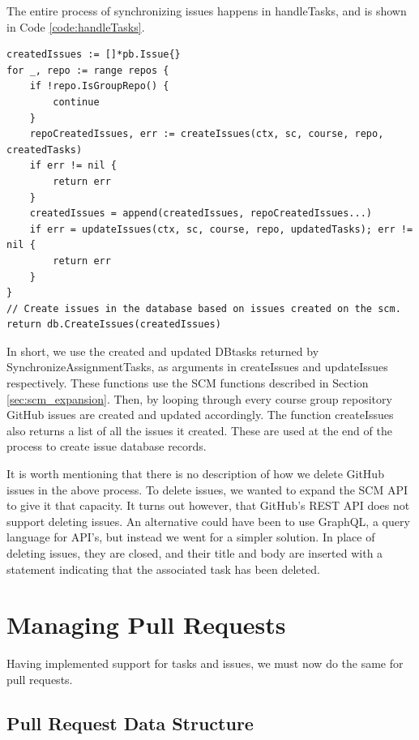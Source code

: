 The entire process of synchronizing issues happens in handleTasks, and is shown in Code \ref{code:handleTasks}.
\begin{lstlisting}[caption={Issue synchronization performed by handleTasks}, language=Golang, label={code:handleTasks},
                    commentstyle={\slshape}]
createdIssues := []*pb.Issue{}
for _, repo := range repos {
	if !repo.IsGroupRepo() {
		continue
	}
	repoCreatedIssues, err := createIssues(ctx, sc, course, repo, createdTasks)
	if err != nil {
		return err
	}
	createdIssues = append(createdIssues, repoCreatedIssues...)
	if err = updateIssues(ctx, sc, course, repo, updatedTasks); err != nil {
		return err
	}
}
// Create issues in the database based on issues created on the scm.
return db.CreateIssues(createdIssues)
\end{lstlisting}

In short, we use the created and updated DBtasks returned by SynchronizeAssignmentTasks, as arguments in createIssues and updateIssues respectively.
These functions use the SCM functions described in Section \ref{sec:scm_expansion}.
Then, by looping through every course group repository GitHub issues are created and updated accordingly.
The function createIssues also returns a list of all the issues it created.
These are used at the end of the process to create issue database records.

It is worth mentioning that there is no description of how we delete GitHub issues in the above process.
To delete issues, we wanted to expand the SCM API to give it that capacity.
It turns out however, that GitHub's REST API does not support deleting issues.
An alternative could have been to use GraphQL, a query language for API's, but instead we went for a simpler solution.
In place of deleting issues, they are closed, and their title and body are inserted with a statement indicating that the associated task has been deleted.

\section{Managing Pull Requests}

Having implemented support for tasks and issues, we must now do the same for pull requests.

\subsection{Pull Request Data Structure}
\label{sec:pull-request-data-structure}


